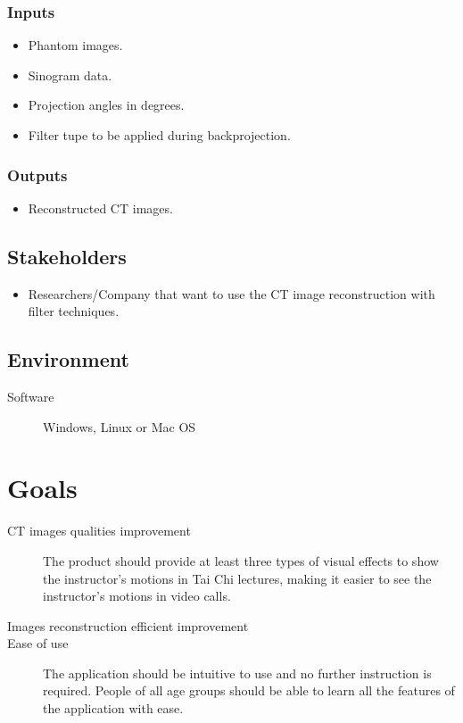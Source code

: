 \documentclass{article}
\begin{document}
\subsubsection{Inputs}
\begin{itemize}
\item Phantom images.
\item Sinogram data.
\item Projection angles in degrees.
\item Filter tupe to be applied during backprojection.
\end{itemize}

\subsubsection{Outputs}
\begin{itemize}
  \item Reconstructed CT images.
\end{itemize}

\subsection{Stakeholders}
\begin{itemize}
  \item Researchers/Company that want to use the CT image reconstruction with
    filter techniques.
\end{itemize}

\subsection{Environment}
\begin{description}
\item[Software] Windows, Linux or Mac OS
\end{description}

\section{Goals}
\begin{description}
\item[CT images qualities improvement]\newline The product should provide at least three
  types of visual effects to show the instructor's motions in Tai Chi lectures,
  making it easier to see the instructor's motions in video calls.
\item[Images reconstruction efficient improvement] \newline
\item[Ease of use] \newline The application should be intuitive to use and no further
  instruction is required. People of all age groups should be able to learn all
  the features of the application with ease.
\end{description}
\end{document}
